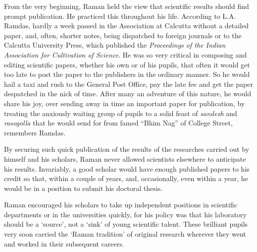 \medskip
{}
\smallskip


\noindent
From the very beginning, Raman held the view that scientific results should find prompt publication. He practiced this throughout his life. According to L.A. Ramdas, hardly a week passed in the Association at Calcutta without a detailed paper, and, often, shorter notes, being dispatched to foreign journals or to the Calcutta University Press, which published the {\em Proceedings of the Indian Association for Cultivation of Science}. He was so very critical in composing and editing scientific papers, whether his own or of his pupils, that often it would get too late to post the paper to the publishers in the ordinary manner. So he would hail a taxi and rush to the General Post Office, pay the late fee and get the paper despatched in the nick of time. After many an adventure of this nature, he would share his joy, over sending away in time an important paper for publication, by treating the anxiously waiting group of pupils to a solid feast of {\em sandesh} and
{\em rasogolla} that he would send for from famed ``Bhim Nag'' of College Street, remembers Ramdas.

By securing such quick publication of the results of the researches carried out by himself and his scholars, Raman never allowed scientists elsewhere to anticipate his results. Invariably, a good scholar would have enough published papers to his credit so that, within a couple of years, and, occasionally, even within a year, he would be in a position to submit his doctoral thesis. 

Raman encouraged his scholars to take up independent positions in scientific departments or in the universities quickly, for his policy was that his laboratory should be a `source', not a `sink' of young scientific talent. These brilliant pupils very soon carried the `Raman tradition' of original research wherever they went and worked in their subsequent careers.

\medskip
{}
\smallskip

